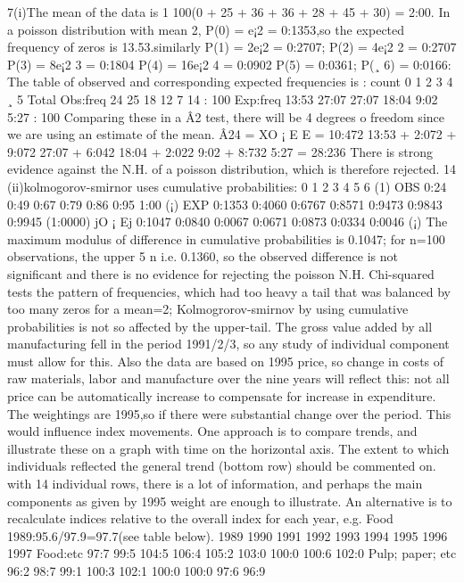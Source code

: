 7(i)The mean of the data is 1
100(0 + 25 + 36 + 36 + 28 + 45 + 30) = 2:00. In a
poisson distribution with mean 2, P(0) = e¡2 = 0:1353,so the expected frequency of
zeros is 13.53.similarly P(1) = 2e¡2 = 0:2707; P(2) = 4e¡2
2 = 0:2707 P(3) = 8e¡2
3 =
0:1804 P(4) = 16e¡2
4 = 0:0902 P(5) = 0:0361; P(¸ 6) = 0:0166: The table of observed
and corresponding expected frequencies is :
count 0 1 2 3 4 ¸ 5 Total
Obs:freq 24 25 18 12 7 14 : 100
Exp:freq 13:53 27:07 27:07 18:04 9:02 5:27 : 100
Comparing these in a Â2 test, there will be 4 degrees o freedom since we are using an
estimate of the mean.
Â24
=
XO ¡ E
E
=
10:472
13:53
+
2:072 + 9:072
27:07
+
6:042
18:04
+
2:022
9:02
+
8:732
5:27
= 28:236
There is strong evidence against the N.H. of a poisson distribution, which is therefore
rejected.
14
(ii)kolmogorov-smirnor uses cumulative probabilities:
0 1 2 3 4 5 6 (1)
OBS 0:24 0:49 0:67 0:79 0:86 0:95 1:00 (¡)
EXP 0:1353 0:4060 0:6767 0:8571 0:9473 0:9843 0:9945 (1:0000)
jO ¡ Ej 0:1047 0:0840 0:0067 0:0671 0:0873 0:0334 0:0046 (¡)
The maximum modulus of difference in cumulative probabilities is 0.1047; for n=100
observations, the upper 5%
n i.e. 0.1360, so the observed difference is
not significant and there is no evidence for rejecting the poisson N.H. Chi-squared tests
the pattern of frequencies, which had too heavy a tail that was balanced by too many
zeros for a mean=2; Kolmogrorov-smirnov by using cumulative probabilities is not so
affected by the upper-tail.
The gross value added by all manufacturing fell in the period 1991/2/3, so any study
of individual component must allow for this. Also the data are based on 1995 price, so
change in costs of raw materials, labor and manufacture over the nine years will reflect
this: not all price can be automatically increase to compensate for increase in expenditure.
The weightings are 1995,so if there were substantial change over the period. This
would influence index movements.
One approach is to compare trends, and illustrate these on a graph with time on the
horizontal axis. The extent to which individuals reflected the general trend (bottom
row) should be commented on. with 14 individual rows, there is a lot of information,
and perhaps the main components as given by 1995 weight are enough to illustrate.
An alternative is to recalculate indices relative to the overall index for each year, e.g.
Food 1989:95.6/97.9=97.7(see table below).
1989 1990 1991 1992 1993 1994 1995 1996 1997
Food:etc 97:7 99:5 104:5 106:4 105:2 103:0 100:0 100:6 102:0
Pulp; paper; etc 96:2 98:7 99:1 100:3 102:1 100:0 100:0 97:6 96:9
